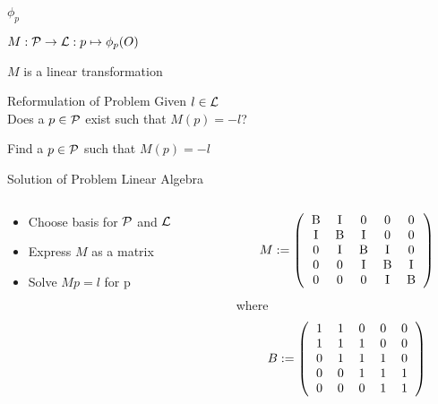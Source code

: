 \begin{frame}{$\phi_{p}$}
	\begin{definition}
		$M : \mathcal{P} \rightarrow \mathcal{L} : p \mapsto \phi_{p}(O)$
	\end{definition}
	
	\pause
	
	\begin{theorem}
		$M$ is a linear transformation
	\end{theorem}
\end{frame}

\begin{frame}{Reformulation of Problem}
	Given $l \in \mathcal{L}$\\
	Does a $p \in \mathcal{P}$ exist such that $M(p) = -l$?
	
	\pause
	
	Find a $p \in \mathcal{P}$ such that $M(p) = -l$	
\end{frame}

\begin{frame}{Solution of Problem}
	Linear Algebra
	\begin{columns}[t]
		\begin{column}{0.45\textwidth}
			\begin{itemize}
				\item Choose basis for $\mathcal{P}$ and $\mathcal{L}$
				\item Express $M$ as a matrix
				\item Solve $M p = l$ for p
			\end{itemize}
			
		\end{column}
		\begin{column}{0.45\textwidth}
			\[
				M := \left(
				\begin{tabular}{ccccc}
					B & I & 0 & 0 & 0 \\
					I & B & I & 0 & 0 \\
					0 & I & B & I & 0 \\
					0 & 0 & I & B & I \\
					0 & 0 & 0 & I & B \\
				\end{tabular}
				\right)
			\]
			where
			\[
				B := \left(
				\begin{tabular}{ccccc}
					1 & 1 & 0 & 0 & 0 \\
					1 & 1 & 1 & 0 & 0 \\
					0 & 1 & 1 & 1 & 0 \\
					0 & 0 & 1 & 1 & 1 \\
					0 & 0 & 0 & 1 & 1 \\
				\end{tabular}
				\right)
			\]
		\end{column}
	\end{columns}
\end{frame}
